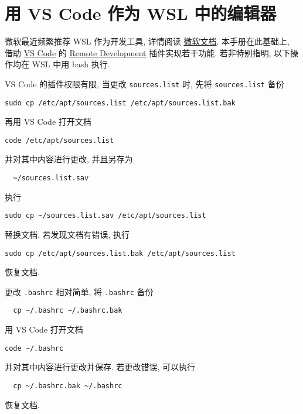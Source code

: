 \section{用 VS Code 作为 WSL 中的编辑器}\label{sec:addition:wsl-editor}

微软最近频繁推荐 WSL 作为开发工具,
详情阅读%
\href{https://learn.microsoft.com/zh-cn/windows/wsl/tutorials/wsl-vscode}{微软文档}.
本手册在此基础上,
借助 \href{https://code.visualstudio.com/download}{VS Code} 的 \href{https://marketplace.visualstudio.com/items?itemName=ms-vscode-remote.vscode-remote-extensionpack}{Remote Development}
插件实现若干功能.
若非特别指明,
以下操作均在 WSL 中用 \textsf{bash} 执行.

VS Code 的插件权限有限,
当更改 \texttt{sources.list} 时,
先将 \texttt{sources.list} 备份
\begin{lstlisting}[deletekeywords = apt]
  sudo cp /etc/apt/sources.list /etc/apt/sources.list.bak
\end{lstlisting}
再用 VS Code 打开文档
\begin{lstlisting}[deletekeywords = apt, morekeywords = code]
  code /etc/apt/sources.list
\end{lstlisting}
并对其中内容进行更改,
并且另存为
\begin{lstlisting}
  ~/sources.list.sav
\end{lstlisting}
执行
\begin{lstlisting}[deletekeywords = apt]
  sudo cp ~/sources.list.sav /etc/apt/sources.list
\end{lstlisting}
替换文档.
若发现文档有错误,
执行
\begin{lstlisting}[deletekeywords = apt]
  sudo cp /etc/apt/sources.list.bak /etc/apt/sources.list
\end{lstlisting}
恢复文档.

更改 \texttt{.bashrc} 相对简单,
将 \texttt{.bashrc} 备份
\begin{lstlisting}
  cp ~/.bashrc ~/.bashrc.bak
\end{lstlisting}
用 VS Code 打开文档
\begin{lstlisting}[morekeywords = code]
  code ~/.bashrc
\end{lstlisting}
并对其中内容进行更改并保存.
若更改错误,
可以执行
\begin{lstlisting}
  cp ~/.bashrc.bak ~/.bashrc
\end{lstlisting}
恢复文档.

